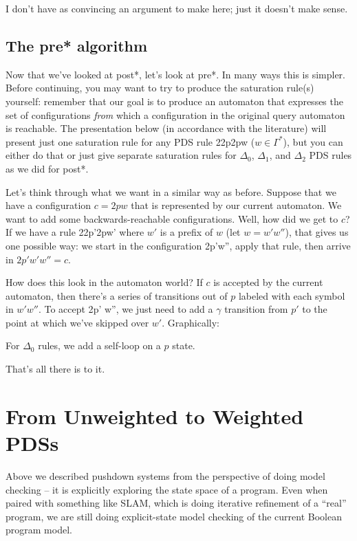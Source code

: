 \documentclass{article}
\newcommand{\config}{2}{\ensuremath{\langle #1, #2 \rangle}}
\newcommand{\rule}{2}{\ensuremath{#1 \righthookarrow #2}}
\begin{document}
\begin{defintion}
I don't have as convincing an argument to make here; just it doesn't
make sense.


\subsection{The pre* algorithm}

Now that we've looked at post*, let's look at pre*. In many ways this
is simpler. Before continuing, you may want to try to produce the
saturation rule(s) yourself: remember that our goal is to produce an
automaton that expresses the set of configurations \emph{from} which a
configuration in the original query automaton is reachable. The
presentation below (in accordance with the literature) will present
just one saturation rule for any PDS rule
\rule{\config{p}{\gamma}}{\config{p}{w}} ($w \in \Gamma^*$), but you
can either do that or just give separate saturation rules for $\Delta_0$,
$\Delta_1$, and $\Delta_2$ PDS rules as we did for post*.

Let's think through what we want in a similar way as before. Suppose
that we have a configuration $c = \config{p}{w}$ that is
represented by our current automaton. We want to add some
backwards-reachable configurations. Well, how did we get to $c$? If we
have a rule \rule{\config{p'}{\gamma}}{\config{p}{w'}} where $w'$ is a
prefix of $w$ (let $w = w'w''$), that gives us one possible way: we
start in the configuration \config{p'}{\gamma w''}, apply that rule,
then arrive in $\config{p'}{w'w''} = c$.

How does this look in the automaton world? If $c$ is accepted by the
current automaton, then there's a series of transitions out of $p$
labeled with each symbol in $w'w''$. To accept \config{p'}{\gamma
  w''}, we just need to add a $\gamma$ transition from $p'$ to the
point at which we've skipped over $w'$. Graphically:



For $\Delta_0$ rules, we add a self-loop on a $p$ state.

That's all there is to it.


\section{From Unweighted to Weighted PDSs}

Above we described pushdown systems from the perspective of doing
model checking -- it is explicitly exploring the state space of a
program. Even when paired with something like SLAM, which is doing
iterative refinement of a ``real'' program, we are still doing
explicit-state model checking of the current Boolean program model.


\end{defintion}
\end{document}
